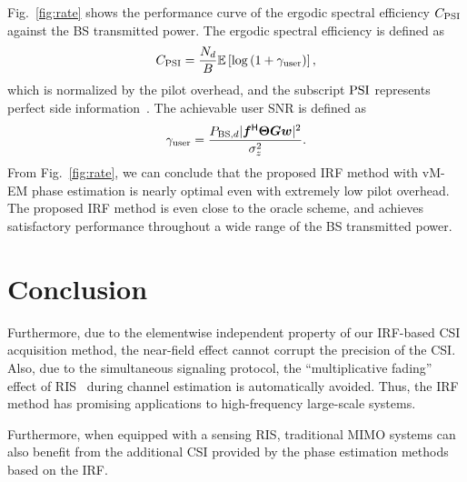 \documentclass[journal,twocolumn]{IEEEtran}
\theoremstyle{nonumberplain}
\def \H {^{\mathsf{H}}}
\newcommand{\red}[1]{{\color{red}{#1}}}
\begin{document}
{    Fig.~\ref{fig:rate} shows the performance curve of the ergodic spectral efficiency $C_{\rm PSI}$ against the BS transmitted power. The ergodic spectral efficiency is defined as 
    \begin{equation}
        C_{\rm PSI} = \frac{N_d}{B} \mathbb{E}\left[\log\left( 1+\gamma_{\rm user} \right)\right], \label{eqn:capacity_def}
    \end{equation} 
    which is normalized by the pilot overhead, and the subscript ${\rm PSI}$ represents perfect side information~\cite{lapidoth2002fading}. The achievable user SNR is defined as 
    \begin{equation}
        \gamma_{\rm user} = \frac{P_{{\rm BS}, d} |{\bm f}\H {\bm \Theta} {\bm G}{\bm w}|^2}{\sigma_z^2}.
    \end{equation}
    From Fig.~\ref{fig:rate}, we can conclude that the proposed IRF method with vM-EM phase estimation is nearly optimal even with extremely low pilot overhead. The proposed IRF method is even close to the oracle scheme, and achieves satisfactory performance throughout a wide range of the BS transmitted power. 
    }

\section{Conclusion}
\label{Conclusion}
    \red{In this paper, we have introduced a dimension-independent CSI acquisition method for sensing RIS-assisted MISO wireless communication systems. 
    Combined with our proposed vM-EM phase estimation algorithm, the pilot overhead of our CSI acquisition method is made independent of the number of RIS elements with low computational cost, enabling the implementation of extremely large-scale RISs to achieve significant beamforming gain. 
    Theoretical analysis have demonstrated the asymptotic optimality of the proposed vM-EM algorithm, which is further supported by the CRLB analysis.  Simulation results have also verified the near-optimality of our vM-EM algorithm. }
    Furthermore, due to the elementwise independent property of our \ac{IRF}-based CSI acquisition method, the near-field effect cannot corrupt the precision of the CSI. 
    Also, due to the simultaneous signaling protocol, the ``multiplicative fading'' effect of RIS~\cite{zhang2021active,liu2021active} during channel estimation is automatically avoided. 
    Thus, the \ac{IRF} method has promising applications to high-frequency large-scale systems. 
    
    \red{For future work, the spatial interferential fringes on the sensing RIS may be exploited to recover the CSI at higher precision, and the data obtained by the power sensors may be utilized to perform joint channel estimation and beamforming with sparse assumptions on the channel. 
    In addition, different interferential frequencies can be assigned to different users to perform multi-user CSI acquisition simultaneously, but the waveforms should be re-designed to avoid interference among users. }
    Furthermore, when equipped with a sensing RIS, traditional MIMO systems can also benefit from the additional CSI provided by the phase estimation methods based on the IRF.  
\end{document}
